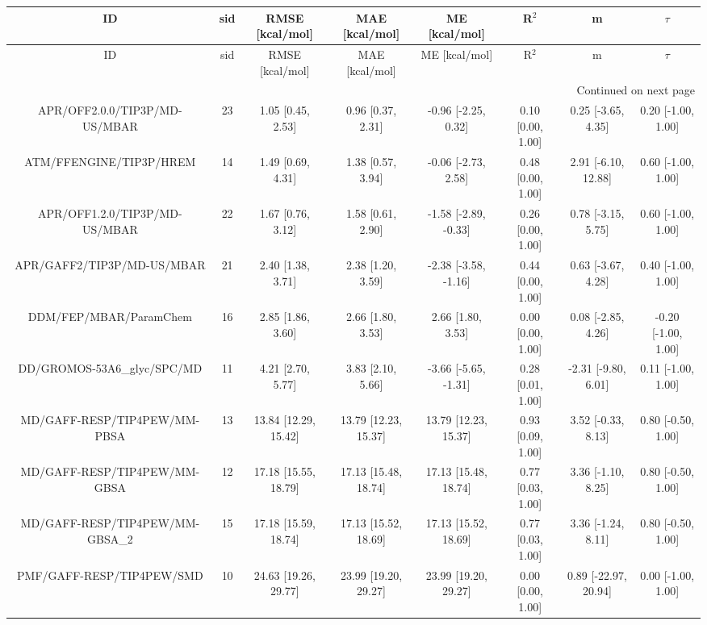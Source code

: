 \documentclass[8pt]{article}
\begin{document}
\begin{center}
\begin{footnotesize}
\begin{longtable}{|cccccccc|}
\toprule
                             ID & sid &      RMSE [kcal/mol] &       MAE [kcal/mol] &        ME [kcal/mol] &             R$^2$ &                    m &              $\tau$ \\
\midrule
\endfirsthead

\toprule
                             ID & sid &      RMSE [kcal/mol] &       MAE [kcal/mol] &        ME [kcal/mol] &             R$^2$ &                    m &              $\tau$ \\
\midrule
\endhead
\midrule
\multicolumn{8}{r}{{Continued on next page}} \\
\midrule
\endfoot

\bottomrule
\endlastfoot
  APR/OFF2.0.0/TIP3P/MD-US/MBAR &  23 &    1.05 [0.45, 2.53] &    0.96 [0.37, 2.31] &  -0.96 [-2.25, 0.32] & 0.10 [0.00, 1.00] &   0.25 [-3.65, 4.35] &  0.20 [-1.00, 1.00] \\
        ATM/FFENGINE/TIP3P/HREM &  14 &    1.49 [0.69, 4.31] &    1.38 [0.57, 3.94] &  -0.06 [-2.73, 2.58] & 0.48 [0.00, 1.00] &  2.91 [-6.10, 12.88] &  0.60 [-1.00, 1.00] \\
  APR/OFF1.2.0/TIP3P/MD-US/MBAR &  22 &    1.67 [0.76, 3.12] &    1.58 [0.61, 2.90] & -1.58 [-2.89, -0.33] & 0.26 [0.00, 1.00] &   0.78 [-3.15, 5.75] &  0.60 [-1.00, 1.00] \\
     APR/GAFF2/TIP3P/MD-US/MBAR &  21 &    2.40 [1.38, 3.71] &    2.38 [1.20, 3.59] & -2.38 [-3.58, -1.16] & 0.44 [0.00, 1.00] &   0.63 [-3.67, 4.28] &  0.40 [-1.00, 1.00] \\
         DDM/FEP/MBAR/ParamChem &  16 &    2.85 [1.86, 3.60] &    2.66 [1.80, 3.53] &    2.66 [1.80, 3.53] & 0.00 [0.00, 1.00] &   0.08 [-2.85, 4.26] & -0.20 [-1.00, 1.00] \\
    DD/GROMOS-53A6\_glyc/SPC/MD &  11 &    4.21 [2.70, 5.77] &    3.83 [2.10, 5.66] & -3.66 [-5.65, -1.31] & 0.28 [0.01, 1.00] &  -2.31 [-9.80, 6.01] &  0.11 [-1.00, 1.00] \\
   MD/GAFF-RESP/TIP4PEW/MM-PBSA &  13 & 13.84 [12.29, 15.42] & 13.79 [12.23, 15.37] & 13.79 [12.23, 15.37] & 0.93 [0.09, 1.00] &   3.52 [-0.33, 8.13] &  0.80 [-0.50, 1.00] \\
   MD/GAFF-RESP/TIP4PEW/MM-GBSA &  12 & 17.18 [15.55, 18.79] & 17.13 [15.48, 18.74] & 17.13 [15.48, 18.74] & 0.77 [0.03, 1.00] &   3.36 [-1.10, 8.25] &  0.80 [-0.50, 1.00] \\
MD/GAFF-RESP/TIP4PEW/MM-GBSA\_2 &  15 & 17.18 [15.59, 18.74] & 17.13 [15.52, 18.69] & 17.13 [15.52, 18.69] & 0.77 [0.03, 1.00] &   3.36 [-1.24, 8.11] &  0.80 [-0.50, 1.00] \\
      PMF/GAFF-RESP/TIP4PEW/SMD &  10 & 24.63 [19.26, 29.77] & 23.99 [19.20, 29.27] & 23.99 [19.20, 29.27] & 0.00 [0.00, 1.00] & 0.89 [-22.97, 20.94] &  0.00 [-1.00, 1.00] \\
\end{longtable}
\end{footnotesize}
\end{center}
\end{document}

